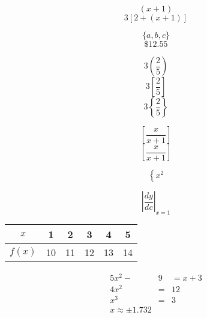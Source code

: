 \documentclass[11pt]{article}
\begin{document}
$$(x+1)$$
$$3[2+(x+1)]$$

$$\{a,b,c\}$$
$$\$ 12.55$$

$$3\left(\frac{2}{5}\right)$$
$$3\left[\frac{2}{5}\right]$$
$$3\left\{\frac{2}{5}\right\}$$

$$[\frac{x}{x+1}]$$
$$\left[\frac{x}{x+1}\right]$$

$$\left \{ x^2 \right. $$



$$\left| \frac{dy}{dc} \right|_{{x}=1}$$

\begin{tabular}{|c|c|c|c|c|c|}

\hline
$x$ & 1 & 2 & 3 & 4 & 5 \\ \hline
$f(x)$ & 10 & 11 & 12 & 13 & 14\\
 \hline

\end{tabular}

\begin{eqnarray*}
5x^2 -&9& = x+3\\ %
4x^2&=&12\\
x^3&=&3\\
x\approx \pm 1.732 %
\end{eqnarray*}
\end{document}
